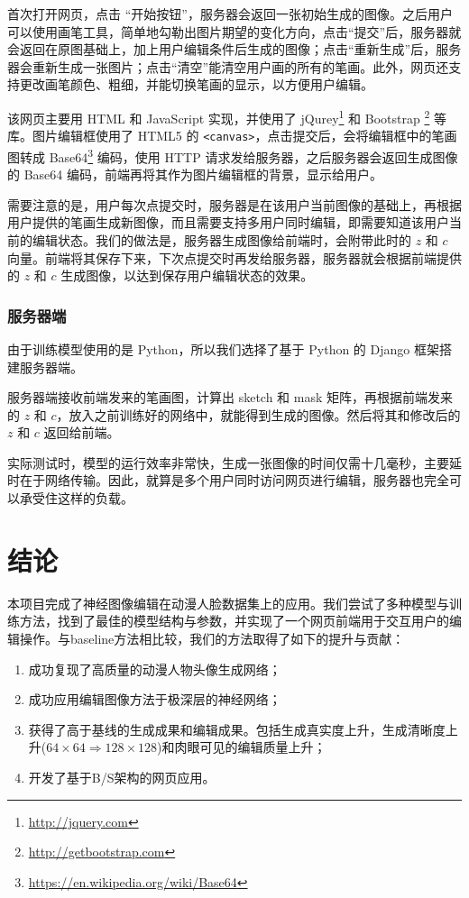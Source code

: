 \documentclass[a4paper,12pt,UTF8]{ctexart}
\begin{document}
首次打开网页，点击 “开始按钮”，服务器会返回一张初始生成的图像。之后用户可以使用画笔工具，简单地勾勒出图片期望的变化方向，点击“提交”后，服务器就会返回在原图基础上，加上用户编辑条件后生成的图像；点击“重新生成”后，服务器会重新生成一张图片；点击“清空”能清空用户画的所有的笔画。此外，网页还支持更改画笔颜色、粗细，并能切换笔画的显示，以方便用户编辑。

该网页主要用 HTML 和 JavaScript 实现，并使用了 jQurey\footnote{\url{http://jquery.com}} 和 Bootstrap \footnote{\url{http://getbootstrap.com}} 等库。图片编辑框使用了 HTML5 的 \texttt{<canvas>}，点击提交后，会将编辑框中的笔画图转成 Base64\footnote{\url{https://en.wikipedia.org/wiki/Base64}} 编码，使用 HTTP 请求发给服务器，之后服务器会返回生成图像的 Base64 编码，前端再将其作为图片编辑框的背景，显示给用户。

需要注意的是，用户每次点提交时，服务器是在该用户当前图像的基础上，再根据用户提供的笔画生成新图像，而且需要支持多用户同时编辑，即需要知道该用户当前的编辑状态。我们的做法是，服务器生成图像给前端时，会附带此时的 $z$ 和 $c$ 向量。前端将其保存下来，下次点提交时再发给服务器，服务器就会根据前端提供的 $z$ 和 $c$ 生成图像，以达到保存用户编辑状态的效果。

\subsubsection{服务器端}
由于训练模型使用的是 Python，所以我们选择了基于 Python 的 Django 框架搭建服务器端。

服务器端接收前端发来的笔画图，计算出 sketch 和 mask 矩阵，再根据前端发来的 $z$ 和 $c$，放入之前训练好的网络中，就能得到生成的图像。然后将其和修改后的 $z$ 和 $c$ 返回给前端。

实际测试时，模型的运行效率非常快，生成一张图像的时间仅需十几毫秒，主要延时在于网络传输。因此，就算是多个用户同时访问网页进行编辑，服务器也完全可以承受住这样的负载。

\section{结论}

本项目完成了神经图像编辑在动漫人脸数据集上的应用。我们尝试了多种模型与训练方法，找到了最佳的模型结构与参数，并实现了一个网页前端用于交互用户的编辑操作。与baseline方法相比较，我们的方法取得了如下的提升与贡献：

\begin{enumerate}
  \item 成功复现了高质量的动漫人物头像生成网络；
  \item 成功应用编辑图像方法于极深层的神经网络；
  \item 获得了高于基线的生成成果和编辑成果。包括生成真实度上升，生成清晰度上升($64 \times 64 \Rightarrow 128 \times 128$)和肉眼可见的编辑质量上升；
  \item 开发了基于B/S架构的网页应用。
\end{enumerate}

\medskip

{\small


}
\end{document}
